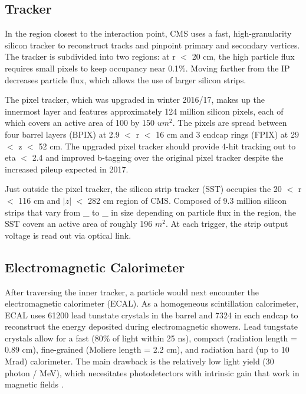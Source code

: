 \documentclass[12pt]{article}
\begin{document}
\subsection{Tracker}
    In the region closest to the interaction point, CMS uses a fast, high-granularity silicon tracker to reconstruct tracks and pinpoint primary and secondary vertices. The tracker is subdivided into two regions: at r $<$ 20 cm, the high particle flux  requires small pixels to keep occupancy near 0.1\%. Moving farther from the IP decreases particle flux, which allows the use of larger silicon strips.

    The pixel tracker, which was upgraded in winter 2016/17, makes up the innermost layer and features approximately 124 million silicon pixels, each of which covers an active area of 100 by 150 $um^2$. The pixels are spread between four barrel layers (BPIX) at 2.9 $<$ r $<$ 16 cm and 3 endcap rings (FPIX) at 29 $<$ z $<$ 52 cm. The upgraded pixel tracker should provide 4-hit tracking out to eta $<$ 2.4 and improved b-tagging over the original pixel tracker despite the increased pileup expected in 2017.
    
    Just outside the pixel tracker, the silicon strip tracker (SST) occupies the 20 $<$ r $<$ 116 cm and $|z|$ $<$ 282 cm region of CMS. Composed of 9.3 million silicon strips that vary from \_ to \_ in size  depending on particle flux in the region, the SST covers an active area of roughly 196 $m^2$. At each trigger, the strip output voltage is read out via optical link.

\subsection{Electromagnetic Calorimeter}
    After traversing the inner tracker, a particle would next encounter the electromagnetic calorimeter (ECAL). As a homogeneous scintillation calorimeter, ECAL uses 61200 lead tunstate crystals in the barrel and 7324 in each endcap to reconstruct the energy deposited during electromagnetic showers. Lead tungstate crystals allow for a fast (80\% of light within 25 ns), compact (radiation length = 0.89 cm), fine-grained (Moliere length = 2.2 cm), and radiation hard (up to 10 Mrad) calorimeter. The main drawback is the relatively low light yield (30 photon / MeV), which necesitates photodetectors with intrinsic gain that work in magnetic fields . 
\end{document}
